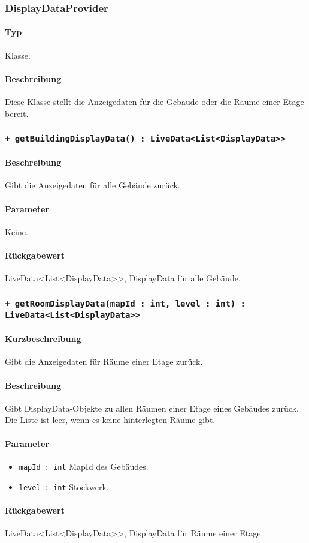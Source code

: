 \subsubsection{DisplayDataProvider}
\paragraph*{Typ}
Klasse.
\paragraph*{Beschreibung}
Diese Klasse stellt die Anzeigedaten für die Gebäude oder die Räume einer Etage bereit.

\subsubsection*{\texttt{+ getBuildingDisplayData() : LiveData<List<DisplayData>>}}%
\paragraph*{Beschreibung}
Gibt die Anzeigedaten für alle Gebäude zurück.
\paragraph*{Parameter}
Keine.
\paragraph*{Rückgabewert}
LiveData<List<DisplayData>>, DisplayData für alle Gebäude.

\subsubsection*{\texttt{+ getRoomDisplayData(mapId : int, level : int) : LiveData<List<DisplayData>>}}%
\paragraph*{Kurzbeschreibung}
Gibt die Anzeigedaten für Räume einer Etage zurück.
\paragraph*{Beschreibung}
Gibt DisplayData-Objekte zu allen Räumen einer Etage eines Gebäudes zurück.\\
Die Liste ist leer, wenn es keine hinterlegten Räume gibt.
\paragraph*{Parameter}
\begin{itemize}
    \item \texttt{mapId : int} MapId des Gebäudes.
    \item \texttt{level : int} Stockwerk.
\end{itemize}
\paragraph*{Rückgabewert}
LiveData<List<DisplayData>>, DisplayData für Räume einer Etage.